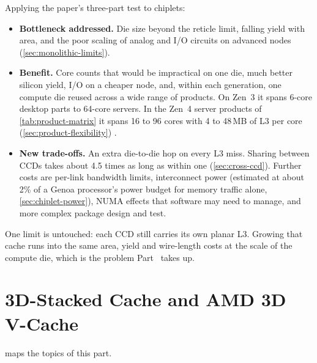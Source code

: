 Applying the paper's three-part test to chiplets:
\begin{itemize}
  \item \textbf{Bottleneck addressed.} Die size beyond the reticle limit, falling yield with area, and the poor scaling of analog and I/O circuits on advanced nodes (\cref{sec:monolithic-limits}).
  \item \textbf{Benefit.} Core counts that would be impractical on one die, much better silicon yield, I/O on a cheaper node, and, within each generation, one compute die reused across a wide range of products. On Zen~3 it spans 6-core desktop parts to 64-core servers. In the Zen~4 server products of \cref{tab:product-matrix} it spans 16 to 96 cores with 4 to 48\,MB of L3 per core (\cref{sec:product-flexibility}) \cite{naffziger2020chiplet,suggs2019zen2}.
  \item \textbf{New trade-offs.} An extra die-to-die hop on every L3 miss. Sharing between CCDs takes about 4.5 times as long as within one (\cref{sec:cross-ccd}). Further costs are per-link bandwidth limits, interconnect power (estimated at about 2\% of a Genoa processor's power budget for memory traffic alone, \cref{sec:chiplet-power}), NUMA effects that software may need to manage, and more complex package design and test.
\end{itemize}
One limit is untouched: each CCD still carries its own planar L3. Growing that cache runs into the same area, yield and wire-length costs at the scale of the compute die, which is the problem Part~\ref{part:stacked-cache} takes up.
\clearpage
\part{3D-Stacked Cache and AMD 3D V-Cache}
\label{part:stacked-cache}
 maps the topics of this part.

